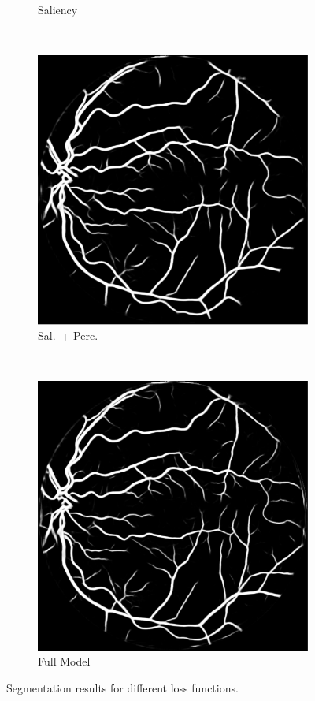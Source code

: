 \documentclass{scrartcl}
\begin{document}
\begin{figure}[htb]
{\begin{subfigure}{0.2\textwidth}
    \caption{Saliency}
\end{subfigure}~
\begin{subfigure}{0.2\textwidth}
\centering
    \includegraphics[width=1.0\textwidth]{segmentation_nogan}
    \caption{Sal.\ + Perc.}
\end{subfigure}~
\begin{subfigure}{0.2\textwidth}
\centering
    \includegraphics[width=1.0\textwidth]{segmentation_gan}
    \caption{Full Model}
\end{subfigure}
}
\caption{Segmentation results for different loss functions.}
\label{fig:segmentation-example}
\end{figure}
\end{document}
